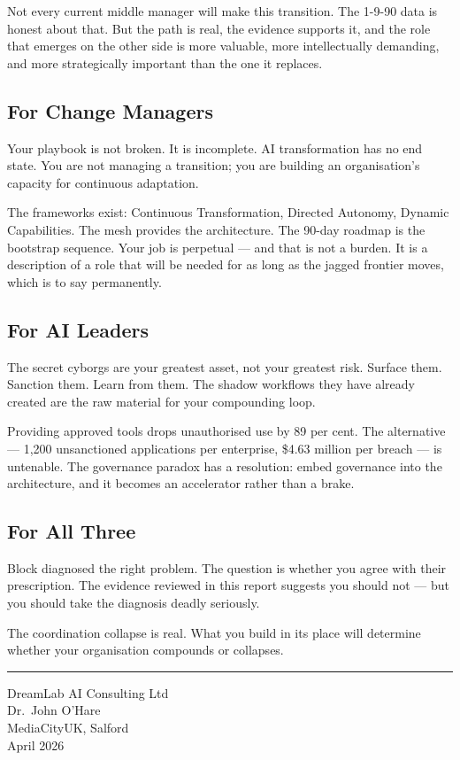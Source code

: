 Not every current middle manager will make this transition. The 1-9-90 data is honest about that. But the path is real, the evidence supports it, and the role that emerges on the other side is more valuable, more intellectually demanding, and more strategically important than the one it replaces.

\subsection{For Change Managers}

Your playbook is not broken. It is incomplete. AI transformation has no end state. You are not managing a transition; you are building an organisation's capacity for continuous adaptation.

The frameworks exist: Continuous Transformation, Directed Autonomy, Dynamic Capabilities. The mesh provides the architecture. The 90-day roadmap is the bootstrap sequence. Your job is perpetual --- and that is not a burden. It is a description of a role that will be needed for as long as the jagged frontier moves, which is to say permanently.

\subsection{For AI Leaders}

The secret cyborgs are your greatest asset, not your greatest risk. Surface them. Sanction them. Learn from them. The shadow workflows they have already created are the raw material for your compounding loop.

Providing approved tools drops unauthorised use by 89 per cent. The alternative --- 1,200 unsanctioned applications per enterprise, \$4.63 million per breach \parencite{IBM2025} --- is untenable. The governance paradox has a resolution: embed governance into the architecture, and it becomes an accelerator rather than a brake.

\subsection{For All Three}

Block diagnosed the right problem. The question is whether you agree with their prescription. The evidence reviewed in this report suggests you should not --- but you should take the diagnosis deadly seriously.

The coordination collapse is real. What you build in its place will determine whether your organisation compounds or collapses.

\vspace{2cm}

\begin{center}
\textcolor{accentgold}{\rule{0.4\textwidth}{1pt}}

\vspace{0.5cm}

{\small\textcolor{navyblue!70!black}{DreamLab AI Consulting Ltd\\
Dr.\ John O'Hare\\
MediaCityUK, Salford\\
April 2026}}
\end{center}
